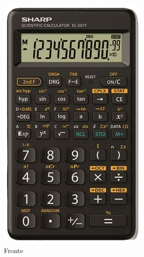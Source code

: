 \begin{figure}
	\centering
	\includegraphics[width=0.7\linewidth]{SHARP/SH13806}
	\caption{Fronte}
	\label{fig:sh13806}
\end{figure}

